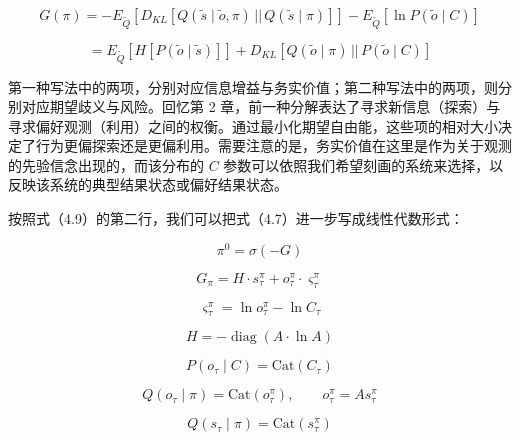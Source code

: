 \begin{equation}
G(\pi)
= -E_{\tilde{Q}}\!\left[D_{KL}\!\left[Q(\tilde{s} \mid \tilde{o}, \pi)\,||\,Q(\tilde{s} \mid \pi)\right]\right]
- E_{\tilde{Q}}[\ln P(\tilde{o} \mid C)]
\tag{4.9}
\end{equation}

\begin{equation}
= E_{\tilde{Q}}[H[P(\tilde{o} \mid \tilde{s})]] + D_{KL}[Q(\tilde{o} \mid \pi)\,||\,P(\tilde{o} \mid C)]
\tag{4.9}
\end{equation}

第一种写法中的两项，分别对应信息增益与务实价值；第二种写法中的两项，则分别对应期望歧义与风险。回忆第 2 章，前一种分解表达了寻求新信息（探索）与寻求偏好观测（利用）之间的权衡。通过最小化期望自由能，这些项的相对大小决定了行为更偏探索还是更偏利用。需要注意的是，务实价值在这里是作为关于观测的先验信念出现的，而该分布的 $C$ 参数可以依照我们希望刻画的系统来选择，以反映该系统的典型结果状态或偏好结果状态。

按照式（4.9）的第二行，我们可以把式（4.7）进一步写成线性代数形式：

\begin{equation}
\pi^0 = \sigma(-G)
\tag{4.10}
\end{equation}

\begin{equation}
G_\pi = H \cdot s^\pi_\tau + o^\pi_\tau \cdot \varsigma^\pi_\tau
\tag{4.10}
\end{equation}

\begin{equation}
\varsigma^\pi_\tau = \ln o^\pi_\tau - \ln C_\tau
\tag{4.10}
\end{equation}

\begin{equation}
H = -\operatorname{diag}(A \cdot \ln A)
\tag{4.10}
\end{equation}

\begin{equation}
P(o_\tau \mid C) = \mathrm{Cat}(C_\tau)
\tag{4.10}
\end{equation}

\begin{equation}
Q(o_\tau \mid \pi) = \mathrm{Cat}(o^\pi_\tau), \qquad o^\pi_\tau = As^\pi_\tau
\tag{4.10}
\end{equation}

\begin{equation}
Q(s_\tau \mid \pi) = \mathrm{Cat}(s^\pi_\tau)
\tag{4.10}
\end{equation}


